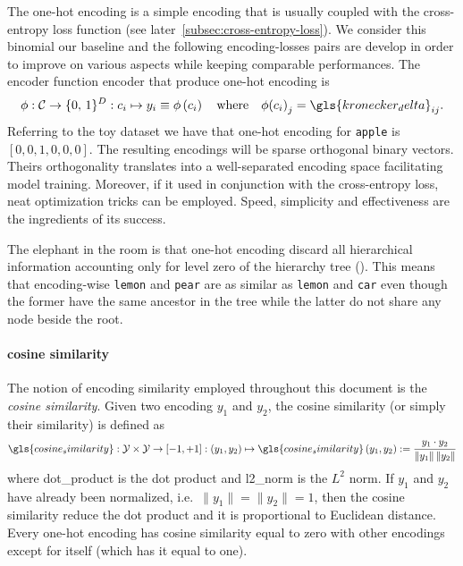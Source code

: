 The one-hot encoding is a simple encoding that is usually coupled with the
cross-entropy loss function (see later~\cref{subsec:cross-entropy-loss}). We
consider this binomial our baseline and the following encoding-losses pairs are
develop in order to improve on various aspects while keeping comparable
performances. The encoder function \gls{encoder} that produce one-hot encoding
is
\begin{equation}
  \phi: \mathcal{C} \to \{0, \,1\}^{D}
      : c_i \mapsto y_i \equiv \phi \left(c_i\right)
  \quad \text{where} \quad
  \phi{\left(c_i\right)}_j = \gls{kronecker_delta}_{ij}.
  \label{eq:one-hot-encoding}
\end{equation}
Referring to the toy dataset we have that one-hot encoding for \texttt{apple} is
$\left[0, 0, 1, 0, 0, 0\right]$. The resulting encodings will be sparse
orthogonal binary vectors. Theirs orthogonality translates into a well-separated
encoding space facilitating model training. Moreover, if it used in conjunction
with the cross-entropy loss, neat optimization tricks can be employed. Speed,
simplicity and effectiveness are the ingredients of its success.

The elephant in the room is that one-hot encoding discard all hierarchical
information accounting only for level zero of the hierarchy tree
(). This means that encoding-wise \texttt{lemon} and
\texttt{pear} are as similar as \texttt{lemon} and \texttt{car} even though the
former have the same ancestor in the tree while the latter do not share any node
beside the root.

\paragraph{cosine similarity} The notion of encoding similarity employed
throughout this document is the \emph{cosine similarity}. Given two encoding
$y_1$ and $y_2$, the cosine similarity (or simply their similarity) is defined
as
\begin{equation}
  \gls{cosine_similarity}: \mathcal{Y} \times \mathcal{Y} \to \left[-1, +1\right]
  : (y_1, y_2) \mapsto \gls{cosine_similarity} \,(y_1, y_2) :=
  \frac{y_1 \cdot y_2}{\|y_1\| \, \|y_2\|}
  \label{eq:cosine-simiarity}
\end{equation}
where \gls{dot_product} is the dot product and \gls{l2_norm} is the $L^2$ norm.
If $y_1$ and $y_2$ have already been normalized, i.e.\ $\|y_1\| = \|y_2\| = 1$,
then the cosine similarity reduce the dot product and it is proportional to
Euclidean distance. Every one-hot encoding has cosine similarity equal to zero
with other encodings except for itself (which has it equal to one).


